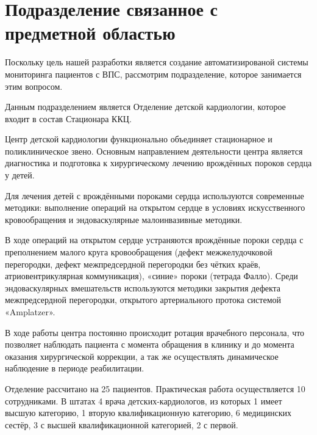 \section{Подразделение связанное с предметной областью}

Поскольку цель нашей разработки является создание автоматизированой системы
мониторинга пациентов с ВПС, рассмотрим подразделение, которое занимается этим
вопросом.

Данным подразделением является Отделение детской кардиологии, которое входит в
состав Стационара ККЦ.

Центр детской кардиологии функционально объединяет стационарное и
поликлиническое звено. Основным направлением деятельности центра является
диагностика и подготовка к хирургическому лечению врождённых пороков сердца у
детей.

Для лечения детей с врождёнными пороками сердца  используются современные
методики:  выполнение  операций на открытом сердце в условиях искусственного
кровообращения  и эндоваскулярные малоинвазивные методики.

В ходе операций на открытом сердце устраняются врождённые пороки сердца с
преполнением малого круга кровообращения (дефект межжелудочковой перегородки,
дефект межпредсердной перегородки без чётких краёв, атриовентрикулярная
коммуникация), «синие» пороки (тетрада Фалло). Среди эндоваскулярных
вмешательств используются методики закрытия дефекта межпредсердной перегородки,
открытого артериального протока системой «Amplatzer».

В ходе работы центра постоянно происходит ротация врачебного персонала, что
позволяет наблюдать пациента с момента обращения в клинику и до момента оказания
хирургической коррекции, а так же осуществлять динамическое наблюдение в периоде
реабилитации.

Отделение рассчитано на 25 пациентов. Практическая работа осуществляется 10
сотрудниками. В штатах 4 врача детских-кардиологов, из которых 1 имеет высшую
категорию, 1 вторую квалификационную категорию, 6 медицинских сестёр, 3 с высшей
квалификационной категорией, 2 с первой.
